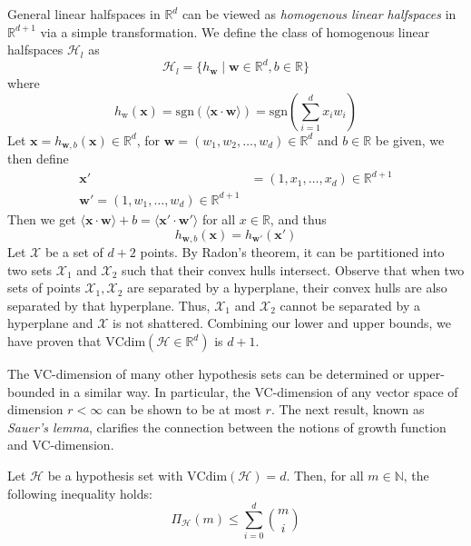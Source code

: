 General linear halfspaces in $\mathbb{R}^{d}$ can be viewed as \textit{homogenous linear halfspaces} in $\mathbb{R}^{d+1}$ via a simple transformation. We define the class of homogenous linear halfspaces $\mathcal{H}_{l}$ as 
\begin{equation*}
    \mathcal{H}_{l} = \{ h_{\bm{w}} \mid \bm{w}\in \mathbb{R}^{d}, b\in \mathbb{R}\}
\end{equation*}
where 
\begin{equation}
    h_{\mbox{w}}(\bm{x}) = \mathrm{sgn}(\langle \bm{x}\cdot \bm{w}\rangle) = \mathrm{sgn}\left( \sum^{d}_{i=1} x_{i} w_{i} \right)
\end{equation}
Let $\bm{x}=h_{\bm{w},b}(\bm{x})\in \mathbb{R}^{d}$, for $\bm{w}=(w_1, w_2,\dots,w_{d})\in \mathbb{R}^{d}$ and $b\in \mathbb{R}$ be given, we then define 
\begin{align}
    \bm{x}' &= (1,x_1,\dots,x_{d}) \in \mathbb{R}^{d+1}\\
    \bm{w}' = (1,w_1,\dots,w_d) \in \mathbb{R}^{d+1}
\end{align}
Then we get $\langle \bm{x}\cdot \bm{w}\rangle + b = \langle \bm{x}'\cdot \bm{w}'\rangle$ for all $x\in \mathbb{R}$, and thus 
\begin{equation*}
    h_{\bm{w},b}(\bm{x}) = h_{\bm{w}'}(\bm{x}')
\end{equation*}
Let $\mathcal{X}$ be a set of $d+2$ points. By Radon's theorem, it can be partitioned into two sets $\mathcal{X}_{1}$ and $\mathcal{X}_{2}$ such that their convex hulls intersect. Observe that when two sets of points $\mathcal{X}_{1},\mathcal{X}_{2}$ are separated by a hyperplane, their convex hulls are also separated by that hyperplane. Thus, $\mathcal{X}_{1}$ and $\mathcal{X}_{2}$ cannot be separated by a hyperplane and $\mathcal{X}$ is not shattered. Combining our lower and upper bounds, we have proven that $\mathrm{VCdim}(\mathcal{H}\in \mathbb{R}^{d})$ is $d+1$. 

The VC-dimension of many other hypothesis sets can be determined or upper-bounded in a similar way. In particular, the VC-dimension of any vector space of dimension $r<\infty$ can be shown to be at most $r$. The next result, known as \textit{Sauer's lemma}, clarifies the connection between the notions of growth function and VC-dimension. 
\begin{theorem}
    Let $\mathcal{H}$ be a hypothesis set with $\mathrm{VCdim}(\mathcal{H}) = d$. Then, for all $m\in \mathbb{N}$, the following inequality holds: 
    \begin{equation}
        \Pi_{\mathcal{H}} (m) \leq \sum^{d}_{i=0} {m\choose i}
    \end{equation}
\end{theorem}

